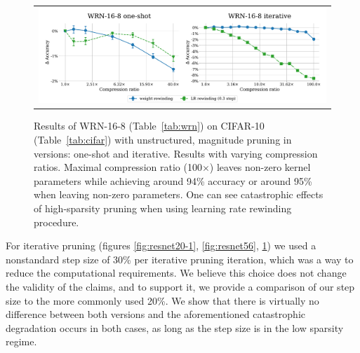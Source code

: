 \begin{figure}[H]
\setlength{\tabcolsep}{0pt}
  \begin{center}
    \begin{tabular}{c}
      \includegraphics[width=1.0\linewidth]{pics/WRN-16-8-LR-rewinding-is-flawed2.pdf}\\
    \end{tabular}
  \end{center}
\caption{Results of WRN-16-8 (Table~\ref{tab:wrn}) on CIFAR-10 (Table~\ref{tab:cifar}) with unstructured, magnitude pruning in versions: one-shot and iterative. Results with varying compression ratios. Maximal compression ratio (100$\times$) leaves  non-zero kernel parameters while achieving around 94\% accuracy or around 95\% when leaving  non-zero parameters. One can see catastrophic effects of high-sparsity pruning when using learning rate rewinding procedure.}
\label{fig:wrn-1}
\end{figure}

For iterative pruning (figures \ref{fig:resnet20-1}, \ref{fig:resnet56}, \ref{fig:wrn-1}) we used a nonstandard step size of 30\% per iterative pruning iteration, which was a way to reduce the computational requirements. We believe this choice does not change the validity of the claims, and to support it, we provide a comparison of our step size to the more commonly used 20\%. We show that there is virtually no difference between both versions and the aforementioned catastrophic degradation occurs in both cases, as long as the step size is in the low sparsity regime.

